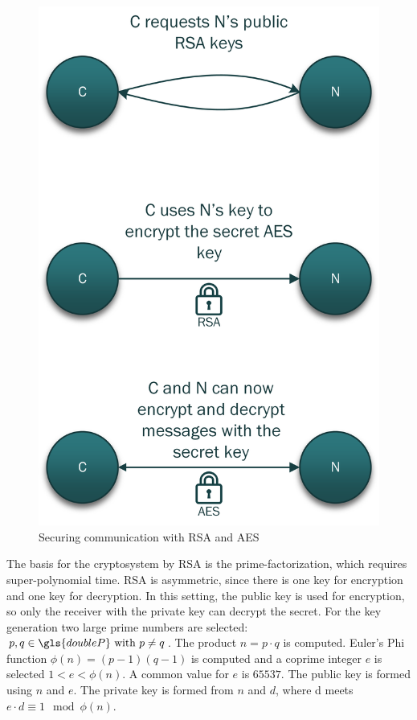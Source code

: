 \begin{figure}[!htbp] %
	\caption{Securing communication with \gls{RSA} and \gls{AES}} \label{figure:RSA/AES scheme}
	\includegraphics[scale=0.8]{figures/encryption-ion.png}
\end{figure}

The basis for the cryptosystem by \gls{RSA} is the prime-factorization, which requires super-polynomial time. \gls{RSA} is asymmetric, since there is one key for encryption and one key for decryption. In this setting, the public key is used for encryption, so only the receiver with the private key can decrypt the secret.
For the key generation two large prime numbers are selected: $p,q \in \gls{doubleP} \ \text{with} \ p\neq q$. The product $n=p\cdot q$ is computed. Euler's Phi function $\phi (n)=(p-1)(q-1)$ is computed and a coprime integer $e$ is selected $1<e<\phi(n)$. A common value for $e$ is $65537$. The public key is formed using $n$ and $e$.
The private key is formed from $n$ and $d$, where d meets $e\cdot d\equiv 1\mod \phi(n)$.

